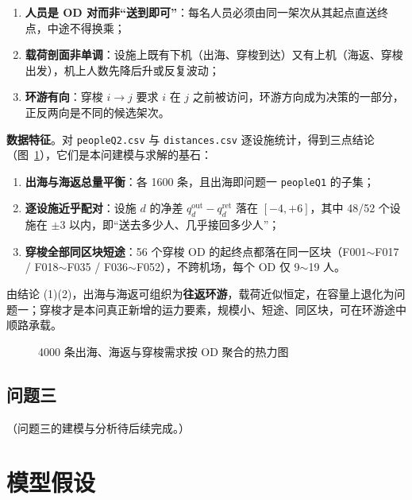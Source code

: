 \documentclass[UTF8,zihao=-4]{ctexart}
\numberwithin{figure}{section}
\numberwithin{table}{section}
\begin{document}
\begin{enumerate}
  \item \textbf{人员是 OD 对而非“送到即可”}：每名人员必须由同一架次从其起点直送终点，中途不得换乘；
  \item \textbf{载荷剖面非单调}：设施上既有下机（出海、穿梭到达）又有上机（海返、穿梭出发），机上人数先降后升或反复波动；
  \item \textbf{环游有向}：穿梭 $i\to j$ 要求 $i$ 在 $j$ 之前被访问，环游方向成为决策的一部分，正反两向是不同的候选架次。
\end{enumerate}

\textbf{数据特征}。对 \texttt{peopleQ2.csv} 与 \texttt{distances.csv} 逐设施统计，得到三点结论（图~\ref{fig:q2_od}），它们是本问建模与求解的基石：

\begin{enumerate}
  \item \textbf{出海与海返总量平衡}：各 1600 条，且出海即问题一 \texttt{peopleQ1} 的子集；
  \item \textbf{逐设施近乎配对}：设施 $d$ 的净差 $q_d^{\mathrm{out}}-q_d^{\mathrm{ret}}$ 落在 $[-4,+6]$，其中 48/52 个设施在 $\pm3$ 以内，即“送去多少人、几乎接回多少人”；
  \item \textbf{穿梭全部同区块短途}：56 个穿梭 OD 的起终点都落在同一区块（F001$\sim$F017 / F018$\sim$F035 / F036$\sim$F052），不跨机场，每个 OD 仅 9$\sim$19 人。
\end{enumerate}

由结论 (1)(2)，出海与海返可组织为\textbf{往返环游}，载荷近似恒定，在容量上退化为问题一；穿梭才是本问真正新增的运力要素，规模小、短途、同区块，可在环游途中顺路承载。

\begin{figure}[H]
  \centering
  \caption{4000 条出海、海返与穿梭需求按 OD 聚合的热力图}
  \label{fig:q2_od}
\end{figure}

\subsection{问题三}
（问题三的建模与分析待后续完成。）

\section{模型假设}
\end{document}
